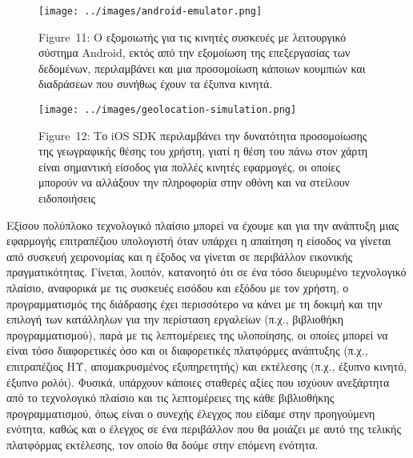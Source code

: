\documentclass[
]{article}
\begin{document}
\leavevmode{}%
\begin{figure}
\hypertarget{fig:android-emulator}{%
\centering
\texttt{[image: ../images/android-emulator.png]}
\caption{Figure~11: Ο εξομοιωτής για τις κινητές συσκευές με λειτουργικό
σύστημα Android, εκτός από την εξομοίωση της επεξεργασίας των δεδομένων,
περιλαμβάνει και μια προσομοίωση κάποιων κουμπιών και διαδράσεων που
συνήθως έχουν τα έξυπνα κινητά.}\label{fig:android-emulator}
}
\end{figure}

\leavevmode{}%
\begin{figure}
\hypertarget{fig:geolocation-simulation}{%
\centering
\texttt{[image: ../images/geolocation-simulation.png]}
\caption{Figure~12: Το iOS SDK περιλαμβάνει την δυνατότητα προσομοίωσης
της γεωγραφικής θέσης του χρήστη, γιατί η θέση του πάνω στον χάρτη είναι
σημαντική είσοδος για πολλές κινητές εφαρμογές, οι οποίες μπορούν να
αλλάξουν την πληροφορία στην οθόνη και να στείλουν
ειδοποιήσεις}\label{fig:geolocation-simulation}
}
\end{figure}

Εξίσου πολύπλοκο τεχνολογικό πλαίσιο μπορεί να έχουμε και για την
ανάπτυξη μιας εφαρμογής επιτραπέζιου υπολογιστή όταν υπάρχει η απαίτηση
η είσοδος να γίνεται από συσκευή χειρονομίας και η έξοδος να γίνεται σε
περιβάλλον εικονικής πραγματικότητας. Γίνεται, λοιπόν, κατανοητό ότι σε
ένα τόσο διευρυμένο τεχνολογικό πλαίσιο, αναφορικά με τις συσκευές
εισόδου και εξόδου με τον χρήστη, ο προγραμματισμός της διάδρασης έχει
περισσότερο να κάνει με τη δοκιμή και την επιλογή των κατάλληλων για την
περίσταση εργαλείων (π.χ., βιβλιοθήκη προγραμματισμού), παρά με τις
λεπτομέρειες της υλοποίησης, οι οποίες μπορεί να είναι τόσο διαφορετικές
όσο και οι διαφορετικές πλατφόρμες ανάπτυξης (π.χ., επιτραπέζιος ΗΥ,
απομακρυσμένος εξυπηρετητής) και εκτέλεσης (π.χ., έξυπνο κινητό, έξυπνο
ρολόι). Φυσικά, υπάρχουν κάποιες σταθερές αξίες που ισχύουν ανεξάρτητα
από το τεχνολογικό πλαίσιο και τις λεπτομέρειες της κάθε βιβλιοθήκης
προγραμματισμού, όπως είναι ο συνεχής έλεγχος που είδαμε στην
προηγούμενη ενότητα, καθώς και ο έλεγχος σε ένα περιβάλλον που θα
μοιάζει με αυτό της τελικής πλατφόρμας εκτέλεσης, τον οποίο θα δούμε
στην επόμενη ενότητα.
\end{document}
